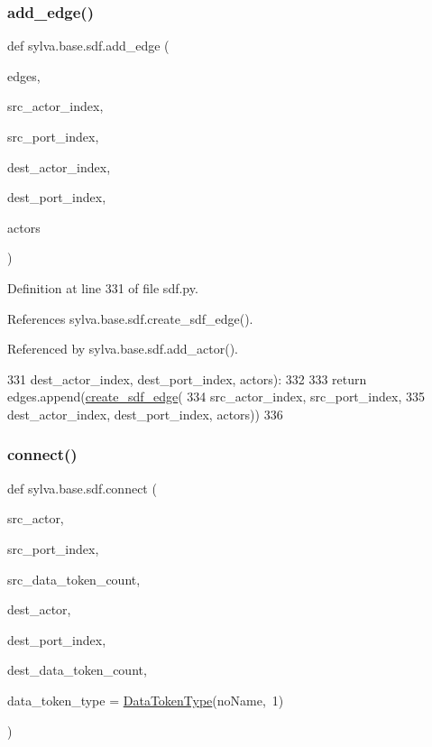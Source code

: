 \subsubsection{\texorpdfstring{add\+\_\+edge()}{add\_edge()}}
{\footnotesize\ttfamily def sylva.\+base.\+sdf.\+add\+\_\+edge (\begin{DoxyParamCaption}\item[{}]{edges,  }\item[{}]{src\+\_\+actor\+\_\+index,  }\item[{}]{src\+\_\+port\+\_\+index,  }\item[{}]{dest\+\_\+actor\+\_\+index,  }\item[{}]{dest\+\_\+port\+\_\+index,  }\item[{}]{actors }\end{DoxyParamCaption})}



Definition at line 331 of file sdf.\+py.



References sylva.\+base.\+sdf.\+create\+\_\+sdf\+\_\+edge().



Referenced by sylva.\+base.\+sdf.\+add\+\_\+actor().


\begin{DoxyCode}
331                  dest\_actor\_index, dest\_port\_index, actors):
332 
333         \textcolor{keywordflow}{return} edges.append(\hyperlink{namespacesylva_1_1base_1_1sdf_a7c688b99c9dcb365aa7598c79f038839}{create\_sdf\_edge}(
334             src\_actor\_index, src\_port\_index,
335             dest\_actor\_index, dest\_port\_index, actors))
336 
\end{DoxyCode}
\mbox{\label{namespacesylva_1_1base_1_1sdf_a0c4055dfc61c95b2f23e5a5dba353302}} 
\subsubsection{\texorpdfstring{connect()}{connect()}}
{\footnotesize\ttfamily def sylva.\+base.\+sdf.\+connect (\begin{DoxyParamCaption}\item[{}]{src\+\_\+actor,  }\item[{}]{src\+\_\+port\+\_\+index,  }\item[{}]{src\+\_\+data\+\_\+token\+\_\+count,  }\item[{}]{dest\+\_\+actor,  }\item[{}]{dest\+\_\+port\+\_\+index,  }\item[{}]{dest\+\_\+data\+\_\+token\+\_\+count,  }\item[{}]{data\+\_\+token\+\_\+type = {\ttfamily \hyperlink{classsylva_1_1base_1_1sdf_1_1_data_token_type}{Data\+Token\+Type}(\textquotesingle{}noName\textquotesingle{},~1)} }\end{DoxyParamCaption})}

